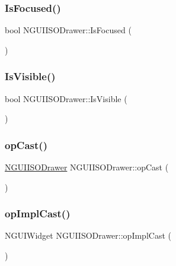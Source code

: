\subsubsection{\texorpdfstring{Is\+Focused()}{IsFocused()}}
{\footnotesize\ttfamily bool N\+G\+U\+I\+I\+S\+O\+Drawer\+::\+Is\+Focused (\begin{DoxyParamCaption}{ }\end{DoxyParamCaption})}

\hypertarget{class_n_g_u_i_i_s_o_drawer_a934330d4104add952430eb7b7f81a6bb}{}\label{class_n_g_u_i_i_s_o_drawer_a934330d4104add952430eb7b7f81a6bb} 
\subsubsection{\texorpdfstring{Is\+Visible()}{IsVisible()}}
{\footnotesize\ttfamily bool N\+G\+U\+I\+I\+S\+O\+Drawer\+::\+Is\+Visible (\begin{DoxyParamCaption}{ }\end{DoxyParamCaption})}

\hypertarget{class_n_g_u_i_i_s_o_drawer_a731e39cd9a4bbdd428bfdf0a31bc4505}{}\label{class_n_g_u_i_i_s_o_drawer_a731e39cd9a4bbdd428bfdf0a31bc4505} 
\subsubsection{\texorpdfstring{op\+Cast()}{opCast()}}
{\footnotesize\ttfamily \hyperlink{class_n_g_u_i_i_s_o_drawer}{N\+G\+U\+I\+I\+S\+O\+Drawer} N\+G\+U\+I\+I\+S\+O\+Drawer\+::op\+Cast (\begin{DoxyParamCaption}{ }\end{DoxyParamCaption})}

\hypertarget{class_n_g_u_i_i_s_o_drawer_a40793f32edd9c6f4a6e941471a4342f8}{}\label{class_n_g_u_i_i_s_o_drawer_a40793f32edd9c6f4a6e941471a4342f8} 
\subsubsection{\texorpdfstring{op\+Impl\+Cast()}{opImplCast()}}
{\footnotesize\ttfamily N\+G\+U\+I\+Widget N\+G\+U\+I\+I\+S\+O\+Drawer\+::op\+Impl\+Cast (\begin{DoxyParamCaption}{ }\end{DoxyParamCaption})}

